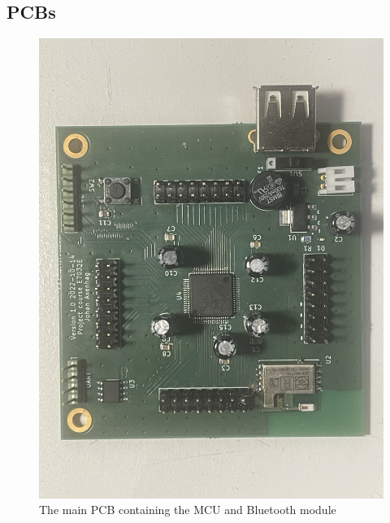 \subsection{PCBs}
\begin{figure} [H]
\begin{center}
\includegraphics[width=\textwidth]{images/pcb.jpg}
   \caption{The main PCB containing the MCU and Bluetooth module}
    \label{fig:PCBData}
\end{center}
\end{figure}
